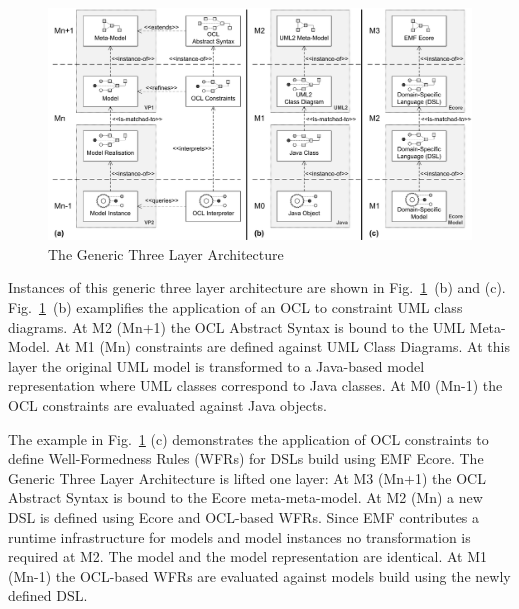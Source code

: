 
	\begin{figure}[t]
			\centering
				\includegraphics[width=1.00\textwidth]{figures/genericlayers.pdf}
			\caption{The Generic Three Layer Architecture}
			\label{fig:genericlayers}
		\end{figure}


Instances of this generic three layer architecture are shown in
Fig.~\ref{fig:genericlayers}~(b) and (c). Fig.~\ref{fig:genericlayers}~(b)
examplifies the application of an OCL to constraint UML class diagrams. At M2 (Mn+1) 
the OCL Abstract Syntax is bound to the UML Meta-Model. At M1 (Mn) constraints are defined against UML
Class Diagrams. At this layer the original UML model is transformed to a
Java-based model representation where UML classes correspond to Java classes.
At M0 (Mn-1) the OCL constraints are evaluated against Java
objects.

The example in Fig.~\ref{fig:genericlayers} (c) demonstrates the
application of OCL constraints to define Well-Formedness Rules (WFRs) for
DSLs build using EMF Ecore. The Generic Three Layer Architecture is lifted one
layer: At M3 (Mn+1) the OCL Abstract Syntax is bound to the Ecore
meta-meta-model. At M2 (Mn) a new DSL is defined using Ecore and OCL-based WFRs. 
Since EMF contributes a runtime infrastructure for models
and model instances no transformation is required at M2. The model and the
model representation are identical. At M1 (Mn-1) the OCL-based WFRs are
evaluated against models build using the newly defined DSL.

